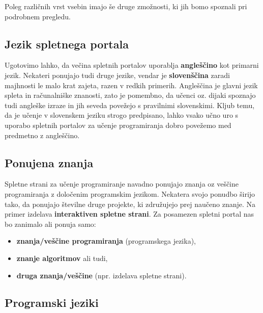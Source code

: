 Poleg različnih vrst vsebin imajo še druge zmožnosti, ki jih bomo
spoznali pri podrobnem pregledu.

\subsection{Jezik spletnega portala}
\label{sec:jezik_spletnega_portala}

Ugotovimo lahko, da večina spletnih portalov uporablja
\textbf{angleščino} kot primarni jezik. Nekateri ponujajo tudi druge
jezike, vendar je \textbf{slovenščina} zaradi majhnosti le malo krat
zajeta, razen v redkih primerih. Angleščina je glavni jezik spleta in
računalniške znanosti, zato je pomembno, da učenci oz. dijaki spoznajo
tudi angleške izraze in jih seveda povežejo s pravilnimi
slovenskimi. Kljub temu, da je učenje v slovenskem jeziku strogo
predpisano, lahko vsako učno uro s uporabo spletnih portalov za učenje
programiranja dobro povežemo med predmetno z angleščino.


\subsection{Ponujena znanja}
\label{sec:vsebina_problemsk_pristop}

Spletne strani za učenje programiranje navadno ponujajo znanja oz
veščine programiranja z določenim programskim jezikom. Nekatera svojo
ponudbo širijo tako, da ponujajo številne druge projekte, ki
združujejo prej naučeno znanje. Na primer izdelava
\textbf{interaktiven spletne strani}. Za posamezen spletni portal nas
bo zanimalo ali ponuja samo:

\begin{itemize}
  \tightlist
\item \textbf{znanja/veščine programiranja} (programskega jezika),
\item \textbf{znanje algoritmov} ali tudi,
\item \textbf{druga znanja/veščine} (npr. izdelava spletne strani).
\end{itemize}


\subsection{Programski jeziki}
\label{sec:_zanaja_programski_jeziki}

